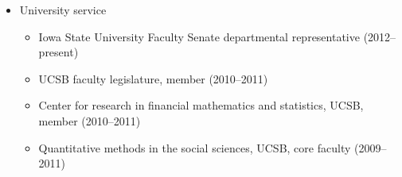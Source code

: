 \documentclass[overlapped,line]{res}
\begin{document}
\begin{resume}
\begin{itemize}
\item University service
\begin{itemize}
\item Iowa State University Faculty Senate departmental representative (2012--present)
\item UCSB faculty legislature, member (2010--2011)
\item Center for research in financial mathematics and statistics, UCSB, member (2010--2011)
\item Quantitative methods in the social sciences, UCSB, core faculty (2009--2011)
 \end{itemize}




\end{itemize}
\end{resume}
\end{document}
